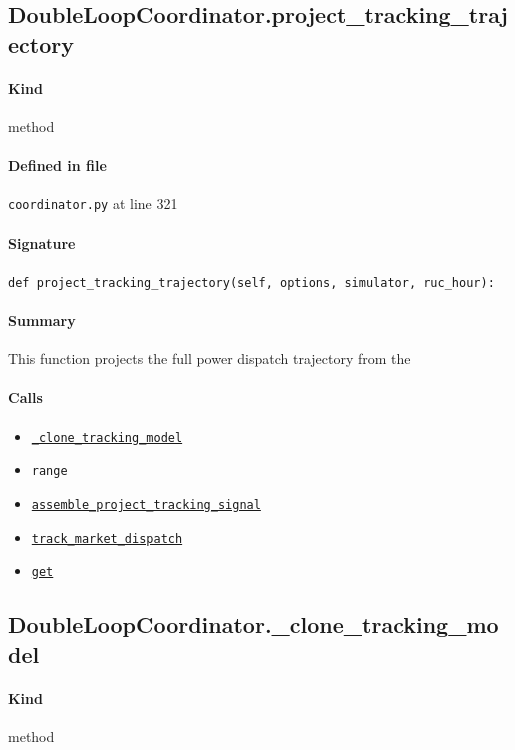 \documentclass[11pt]{report}
\begin{document}
\subsection{DoubleLoopCoordinator.project\_tracking\_trajectory}
\label{def:coordinator.py:DoubleLoopCoordinator.project_tracking_trajectory:L321}
\paragraph{Kind} method
\paragraph{Defined in file} \texttt{coordinator.py} at line 321
\paragraph{Signature} \texttt{def project\_tracking\_trajectory(self, options, simulator, ruc\_hour):}
\paragraph{Summary} This function projects the full power dispatch trajectory from the
\paragraph{Calls}
\begin{itemize}[leftmargin=*]
  \item \hyperref[def:coordinator.py:DoubleLoopCoordinator._clone_tracking_model:L366]{\texttt{\_clone\_tracking\_model}}
  \item \texttt{range}
  \item \hyperref[def:coordinator.py:DoubleLoopCoordinator.assemble_project_tracking_signal:L296]{\texttt{assemble\_project\_tracking\_signal}}
  \item \hyperref[def:tracker.py:Tracker.track_market_dispatch:L283]{\texttt{track\_market\_dispatch}}
  \item \hyperref[def:tests-test_backcaster.py:DAPrices.get:L294]{\texttt{get}}
\end{itemize}
\subsection{DoubleLoopCoordinator.\_clone\_tracking\_model}
\label{def:coordinator.py:DoubleLoopCoordinator._clone_tracking_model:L366}
\paragraph{Kind} method
\end{document}
